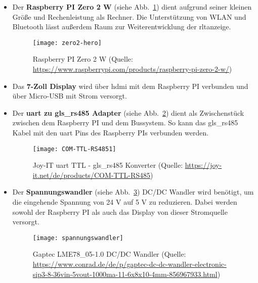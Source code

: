 \begin{itemize}
    \item Der \textbf{Raspberry PI Zero 2 W} (siehe Abb.~\ref{fig:zero_2_w}) dient aufgrund seiner kleinen Größe und Rechenleistung als Rechner. Die Unterstützung von WLAN und Bluetooth lässt außerdem Raum zur Weiterentwicklung der \ac{rltanzeige}.
    \begin{figure}[H]
        \centering
        \texttt{[image: zero2-hero]}
        \caption[Raspberry PI Zero 2 W (Quelle: \url{https://www.raspberrypi.com/products/raspberry-pi-zero-2-w/}, Zugriff am 28.03.2024)]{Raspberry PI Zero 2 W (Quelle: \url{https://www.raspberrypi.com/products/raspberry-pi-zero-2-w/}) \label{fig:zero_2_w}}
    \end{figure}
    
    \item Das \textbf{7-Zoll Display} wird über \ac{hdmi} mit dem Raspberry PI verbunden und über Micro-USB mit Strom versorgt.

    \item Der \textbf{\ac{uart} zu \gls{gls_rs485} Adapter} (siehe Abb.~\ref{fig:ttl_rs485_adapter}) dient als Zwischenstück zwischen dem Raspberry PI und dem Bussystem. So kann das \gls{gls_rs485} Kabel mit den \ac{uart} Pins des Raspberry PIs verbunden werden.
    \begin{figure}[H]
        \centering
        \texttt{[image: COM-TTL-RS4851]}
        \caption[Joy-IT \ac{uart} TTL - \gls{gls_rs485} Konverter (Quelle: \url{https://joy-it.net/de/products/COM-TTL-RS485}, Zugriff am 28.03.2024)]{Joy-IT \ac{uart} TTL - \gls{gls_rs485} Konverter (Quelle: \url{https://joy-it.net/de/products/COM-TTL-RS485}) \label{fig:ttl_rs485_adapter}}
    \end{figure}

    \item Der \textbf{Spannungswandler} (siehe Abb.~\ref{fig:spannungswandler}) \bzw DC/DC Wandler wird benötigt, um die eingehende Spannung von 24 V auf 5 V zu reduzieren. Dabei werden sowohl der Raspberry PI als auch das Display von dieser Stromquelle versorgt.
    \begin{figure}[H]
        \centering
        \texttt{[image: spannungswandler]}
        \caption[Gaptec LME78\_05-1.0 DC/DC Wandler (Quelle: \url{https://www.conrad.de/de/p/gaptec-dc-dc-wandler-electronic-sip3-8-36vin-5vout-1000ma-11-6x8x10-4mm-856967933.html}, Zugriff am 28.03.2024)]{Gaptec LME78\_05-1.0 DC/DC Wandler (Quelle: \url{https://www.conrad.de/de/p/gaptec-dc-dc-wandler-electronic-sip3-8-36vin-5vout-1000ma-11-6x8x10-4mm-856967933.html}) \label{fig:spannungswandler}}
    \end{figure}
\end{itemize}